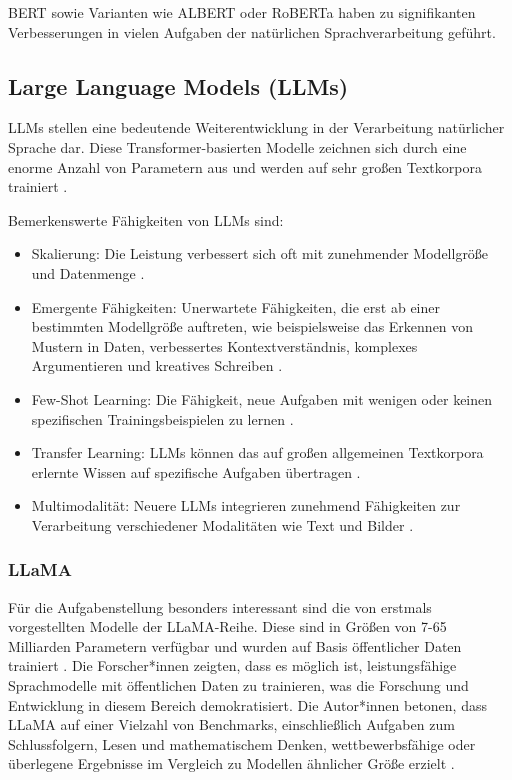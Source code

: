 \gls{BERT} \cite{DevlinJacob2019BPoD} sowie Varianten wie ALBERT \cite{LanZhenzhong2019AALB} oder RoBERTa \cite{liu2019robertarobustlyoptimizedbert} haben zu signifikanten Verbesserungen in vielen Aufgaben der natürlichen Sprachverarbeitung geführt.

\subsection{Large Language Models (LLMs)}
\label{subsec:llms}

\glspl{LLM} stellen eine bedeutende Weiterentwicklung in der Verarbeitung natürlicher Sprache dar. Diese Transformer-basierten Modelle zeichnen sich durch eine enorme Anzahl von Parametern aus und werden auf sehr großen Textkorpora trainiert \cite{VaswaniAshish2023AIAY}.

Bemerkenswerte Fähigkeiten von \glspl{LLM} sind:

\begin{itemize}
	\item Skalierung: Die Leistung verbessert sich oft mit zunehmender Modellgröße und Datenmenge \cite{TouvronHugo2023LOaE}.
	\item Emergente Fähigkeiten: Unerwartete Fähigkeiten, die erst ab einer bestimmten Modellgröße auftreten, wie beispielsweise das Erkennen von Mustern in Daten, verbessertes Kontextverständnis, komplexes Argumentieren und kreatives Schreiben \cite{BrownTomB2020LMaF}.
	\item Few-Shot Learning: Die Fähigkeit, neue Aufgaben mit wenigen oder keinen spezifischen Trainingsbeispielen zu lernen \cite{BrownTomB2020LMaF}.
	\item Transfer Learning: \glspl{LLM} können das auf großen allgemeinen Textkorpora erlernte Wissen auf spezifische Aufgaben übertragen \cite{DevlinJacob2019BPoD}.
	\item Multimodalität: Neuere \glspl{LLM} integrieren zunehmend Fähigkeiten zur Verarbeitung verschiedener Modalitäten wie Text und Bilder \cite{LiJunnan2023BBLP}.
\end{itemize}

\subsubsection{LLaMA}
\label{subsubsec:LLaMA}

Für die Aufgabenstellung besonders interessant sind die von \textcite{TouvronHugo2023LOaE} erstmals vorgestellten Modelle der LLaMA-Reihe. Diese sind in Größen von 7-65 Milliarden Parametern verfügbar und wurden auf Basis öffentlicher Daten trainiert \cite{TouvronHugo2023LOaE}. Die Forscher*innen zeigten, dass es möglich ist, leistungsfähige Sprachmodelle mit öffentlichen Daten zu trainieren, was die Forschung und Entwicklung in diesem Bereich demokratisiert. Die Autor*innen betonen, dass LLaMA auf einer Vielzahl von Benchmarks, einschließlich Aufgaben zum Schlussfolgern, Lesen und mathematischem Denken, wettbewerbsfähige oder überlegene Ergebnisse im Vergleich zu Modellen ähnlicher Größe erzielt \cite{TouvronHugo2023LOaE}.

